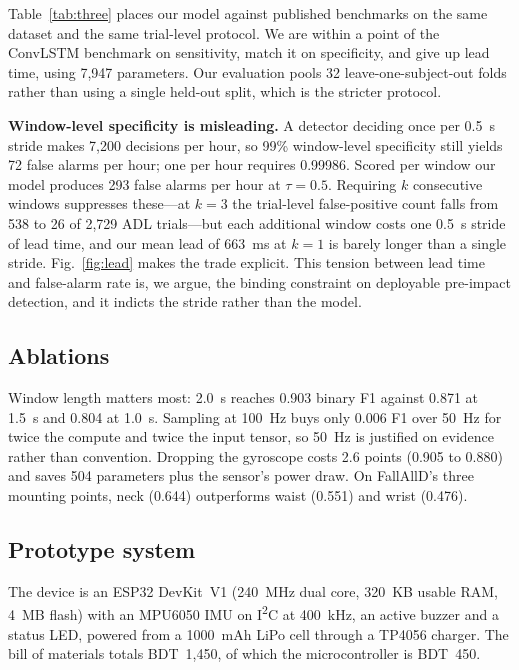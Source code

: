 \documentclass[conference]{IEEEtran}
\begin{document}
Table~\ref{tab:three} places our model against published benchmarks on the same
dataset and the same trial-level protocol. We are within a point of the ConvLSTM
benchmark on sensitivity, match it on specificity, and give up lead time, using 7{,}947
parameters. Our evaluation pools 32 leave-one-subject-out folds rather than using a
single held-out split, which is the stricter protocol.

\textbf{Window-level specificity is misleading.} A detector deciding once per 0.5~s
stride makes 7{,}200 decisions per hour, so 99\% window-level specificity still yields
72 false alarms per hour; one per hour requires 0.99986. Scored per window our model
produces 293 false alarms per hour at $\tau{=}0.5$. Requiring $k$ consecutive windows
suppresses these---at $k{=}3$ the trial-level false-positive count falls from 538 to 26
of 2{,}729 ADL trials---but each additional window costs one 0.5~s stride of lead time,
and our mean lead of 663~ms at $k{=}1$ is barely longer than a single stride.
Fig.~\ref{fig:lead} makes the trade explicit. This tension between lead time and false-alarm rate is, we
argue, the binding constraint on deployable pre-impact detection, and it indicts the
stride rather than the model.

\subsection{Ablations}

Window length matters most: 2.0~s reaches 0.903 binary F1 against 0.871 at 1.5~s and
0.804 at 1.0~s. Sampling at 100~Hz buys only 0.006 F1 over 50~Hz for twice the compute
and twice the input tensor, so 50~Hz is justified on evidence rather than convention.
Dropping the gyroscope costs 2.6 points (0.905 to 0.880) and saves 504 parameters plus
the sensor's power draw. On FallAllD's three mounting points, neck (0.644) outperforms
waist (0.551) and wrist (0.476).

\subsection{Prototype system}
\label{sec:system}

The device is an ESP32 DevKit~V1 (240~MHz dual core, 320~KB usable RAM, 4~MB flash)
with an MPU6050 IMU on I\textsuperscript{2}C at 400~kHz, an active buzzer and a status
LED, powered from a 1000~mAh LiPo cell through a TP4056 charger. The bill of materials
totals BDT~1{,}450, of which the microcontroller is BDT~450.
\end{document}
